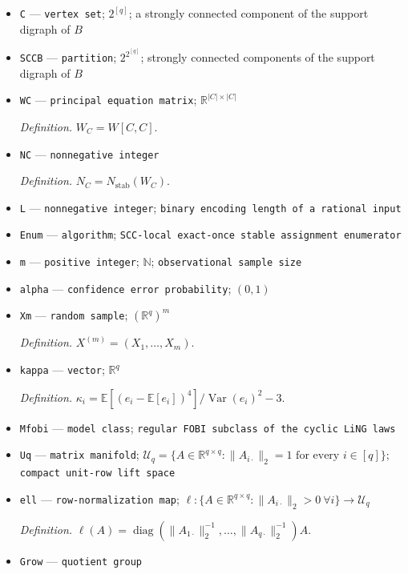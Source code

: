 \documentclass{article}
\begin{document}
\begin{itemize}
  \item \texttt{C} --- \texttt{vertex set}; \(2^{[q]}\); a strongly connected component of the support digraph of \(B\)
  \item \texttt{SCCB} --- \texttt{partition}; \(2^{2^{[q]}}\); strongly connected components of the support digraph of \(B\)
  \item \texttt{WC} --- \texttt{principal equation matrix}; \(\mathbb R^{|C|\times|C|}\)
  \par\smallskip\noindent\emph{Definition.} \(W_C=W[C,C]\).
  \item \texttt{NC} --- \texttt{nonnegative integer}
  \par\smallskip\noindent\emph{Definition.} \(N_C=N_{\mathrm{stab}}(W_C)\).
  \item \texttt{L} --- \texttt{nonnegative integer}; \texttt{binary encoding length of a rational input}
  \item \texttt{Enum} --- \texttt{algorithm}; \texttt{SCC-\allowbreak{}local exact-\allowbreak{}once stable assignment enumerator}
  \item \texttt{m} --- \texttt{positive integer}; \(\mathbb N\); \texttt{observational sample size}
  \item \texttt{alpha} --- \texttt{confidence error probability}; \((0,1)\)
  \item \texttt{Xm} --- \texttt{random sample}; \((\mathbb R^q)^m\)
  \par\smallskip\noindent\emph{Definition.} \(X^{(m)}=(X_1,\ldots,X_m)\).
  \item \texttt{kappa} --- \texttt{vector}; \(\mathbb R^q\)
  \par\smallskip\noindent\emph{Definition.} \(\kappa_i=\mathbb E[(e_i-\mathbb E[e_i])^4]/\operatorname{Var}(e_i)^2-3\).
  \item \texttt{Mfobi} --- \texttt{model class}; \texttt{regular FOBI subclass of the cyclic LiNG laws}
  \item \texttt{Uq} --- \texttt{matrix manifold}; \(\mathcal U_q=\{A\in\mathbb R^{q\times q}:\|A_{i\cdot}\|_2=1\text{ for every }i\in[q]\}\); \texttt{compact unit-\allowbreak{}row lift space}
  \item \texttt{ell} --- \texttt{row-\allowbreak{}normalization map}; \(\ell:\{A\in\mathbb R^{q\times q}:\|A_{i\cdot}\|_2>0\ \forall i\}\to\mathcal U_q\)
  \par\smallskip\noindent\emph{Definition.} \(\ell(A)=\operatorname{diag}(\|A_{1\cdot}\|_2^{-1},\ldots,\|A_{q\cdot}\|_2^{-1})A\).
  \item \texttt{Grow} --- \texttt{quotient group}

\end{itemize}
\end{document}
